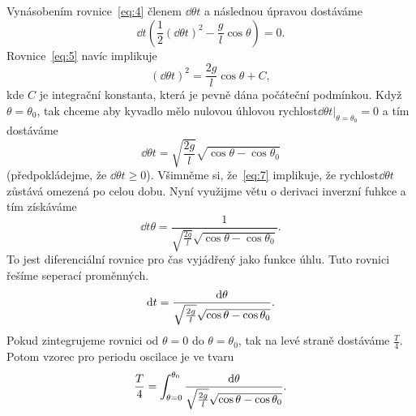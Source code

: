 \documentclass[reqno, a4paper]{amsart}
\begin{document}
		
		Vynásobením rovnice~\eqref{eq:4} členem $\dd{\theta}{t}$ a následnou úpravou dostáváme
		\begin{equation}
			\label{eq:5}
			\dd{}{t}
			\left(
			\frac{1}{2}
			\left(
			\dd{\theta}{t}
			\right)^2
			-
			\frac{g}{l}
			\cos \theta
			\right)
			=
			0
			.
		\end{equation}
		Rovnice~\eqref{eq:5} navíc implikuje
		\begin{equation}
			\label{eq:6}
			\left(
			\dd{\theta}{t}
			\right)^2
			=
			\frac{2g}{l}
			\cos \theta
			+
			C
			,
		\end{equation}
		kde $C$ je integrační konstanta, která je pevně dána počáteční podmínkou. Když $\theta = \theta_{0}$, tak chceme aby kyvadlo mělo nulovou úhlovou rychlost$\left. \dd{\theta}{t} \right|_{\theta = \theta_{0}}= 0$ a tím dostáváme
		\begin{equation}
			\label{eq:7}
			\dd{\theta}{t}
			=
			\sqrt{
				\frac{2g}{l}
			}
			\sqrt{\cos \theta - \cos \theta_{0}}
		\end{equation}
		(předpokládejme, že $\dd{\theta}{t} \geq 0$). Všimněme si, že~\eqref{eq:7} implikuje, že rychlost$\dd{\theta}{t}$ zůstává omezená po celou dobu. Nyní využijme větu o derivaci inverzní fuhkce a tím získáváme
		\begin{equation}
			\label{eq:8}
			\dd{t}{\theta}
			=
			\frac{1}
			{
				\sqrt{
					\frac{2g}{l}
				}
				\sqrt{\cos \theta - \cos \theta_{0}}
			}
			.
		\end{equation}
		To jest diferenciální rovnice pro čas vyjádřený jako funkce úhlu. Tuto rovnici řešíme seperací proměnných.
		\begin{equation}
			\label{eq:9}
			\mathrm{d} t  
			=
			\frac{\mathrm{d} \theta}
			{
				\sqrt{
					\frac{2g}{l}
				}
				\sqrt{\cos \theta - \cos \theta_{0}}
			}
			.
		\end{equation}
		Pokud zintegrujeme rovnici od $\theta=0$ do $\theta=\theta_{0}$, tak na levé straně dostáváme $\frac{T}{4}$. Potom vzorec pro periodu oscilace je ve tvaru
		\begin{equation}
			\label{eq:10}
			\frac{T}{4}
			=
			\int_{\theta=0}^{\theta_{0}}
			\frac{\mathrm{d} \theta}
			{
				\sqrt{
					\frac{2g}{l}
				}
				\sqrt{\cos \theta - \cos \theta_{0}}
			}
			.
		\end{equation}
		
\end{document}
